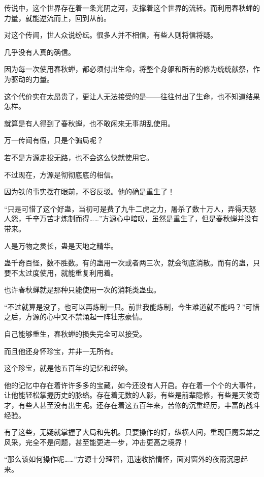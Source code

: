 
\begin{this_body}



传说中，这个世界存在着一条光阴之河，支撑着这个世界的流转。而利用春秋蝉的力量，就能逆流而上，回到从前。

对这个传闻，世人众说纷纭。很多人并不相信，有些人则将信将疑。

几乎没有人真的确信。

因为每一次使用春秋蝉，都必须付出生命，将整个身躯和所有的修为统统献祭，作为驱动的力量。

这个代价实在太昂贵了，更让人无法接受的是——往往付出了生命，也不知道结果怎样。

就算是有人得到了春秋蝉，也不敢闲来无事胡乱使用。

万一传闻有假，只是个骗局呢？

若不是方源走投无路，也不会这么快就使用它。

不过现在，方源是彻彻底底的相信。

因为铁的事实摆在眼前，不容反驳。他的确是重生了！

“只是可惜了这个好蛊，当初可是费了九牛二虎之力，屠杀了数十万人，弄得天怒人怨，千辛万苦才炼制而得……”方源心中暗叹，虽然是重生了，但是春秋蝉并没有带来。

人是万物之灵长，蛊是天地之精华。

蛊千奇百怪，数不胜数。有的蛊用一次或者两三次，就会彻底消散。而有的蛊，只要不太过度使用，就能重复利用着。

也许春秋蝉就是那种只能使用一次的消耗类蛊虫。

“不过就算是没了，也可以再炼制一只。前世我能炼制，今生难道就不能吗？”可惜之后，方源的心中又不禁涌起一阵壮志豪情。

自己能够重生，春秋蝉的损失完全可以接受。

而且他还身怀珍宝，并非一无所有。

这个珍宝，就是他五百年的记忆和经验。

他的记忆中存在着许许多多的宝藏，如今还没有人开启。存在着一个个的大事件，让他能轻松掌握历史的脉络。存在着无数的人影，有些是前辈隐修，有些是天俊奇才，有些人甚至没有出生呢。还存在着这五百年来，苦修的沉重经历，丰富的战斗经验。

有了这些，无疑就掌握了大局和先机。只要操作的好，纵横人间，重现巨魔枭雄之风采，完全不是问题，甚至能更进一步，冲击更高之境界！

“那么该如何操作呢……”方源十分理智，迅速收拾情怀，面对窗外的夜雨沉思起来。


\end{this_body}

